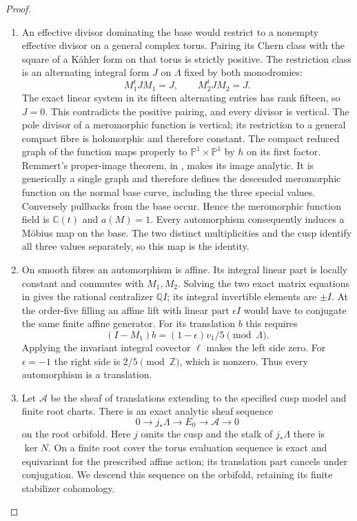 \documentclass[11pt,a4paper]{article}
\theoremstyle{definition}
\begin{document}
\begin{proof}
\begin{enumerate}[label=\arabic*.]
\item An effective divisor dominating the base would restrict to
a nonempty effective divisor on a general complex torus.
Pairing its Chern class with the square of a Kähler form
on that torus is strictly positive. The restriction class is an alternating integral form $J$ on $\Lambda$
fixed by both monodromies:
\[
M_1^tJM_1=J,\qquad M_2^tJM_2=J.
\]
The exact linear system in its fifteen alternating entries has rank
fifteen, so $J=0$.  This contradicts the positive pairing, and every
divisor is vertical.
The pole divisor of a meromorphic function is vertical;
its restriction to a general compact fibre is holomorphic
and therefore constant. The compact reduced graph of the function maps properly to
$\mathbb P^1\times\mathbb P^1$ by $h$ on its first factor.
Remmert's proper-image theorem, in
\cite[\S7, Satz~1, p.~60]{Grauert1960D}, makes its image analytic.
It is generically a single graph and therefore defines the descended
meromorphic function on the normal base curve, including the three
special values.
Conversely pullbacks from the base occur. Hence the
meromorphic function field is $\mathbb C(t)$ and $a(M)=1$.
Every automorphism consequently induces a Möbius map on
the base. The two distinct multiplicities and the cusp
identify all three values separately, so this map is the
identity.

\item On smooth fibres an automorphism is affine. Its integral
linear part is locally constant and commutes with $M_1,M_2$.
Solving the two exact matrix equations in
 gives the rational
centralizer $\mathbb Q I$; its integral invertible elements
are $\pm I$. At the order-five filling an affine lift with
linear part $\epsilon I$ would have to conjugate the same
finite affine generator. For its translation $b$ this
requires
\[
(I-M_1)b=(1-\epsilon)v_1/5\pmod\Lambda.
\]
Applying the invariant integral covector $\ell$ makes the
left side zero. For $\epsilon=-1$ the right side is
$2/5\pmod\mathbb Z$, which is nonzero. Thus every
automorphism is a translation.

\item Let $\mathcal A$ be the sheaf of translations extending to
the specified cusp model and finite root charts. There is
an exact analytic sheaf sequence
\[
0\to j_*\Lambda\to E_0\to\mathcal A\to0
\]
on the root orbifold. Here $j$ omits the cusp and the stalk
of $j_*\Lambda$ there is $\ker N$.
On a finite root cover the torus evaluation sequence is exact and
equivariant for the prescribed affine action; its translation part
cancels under conjugation.  We descend this sequence on the orbifold,
retaining its finite stabilizer cohomology.


\end{enumerate}
\end{proof}
\end{document}
